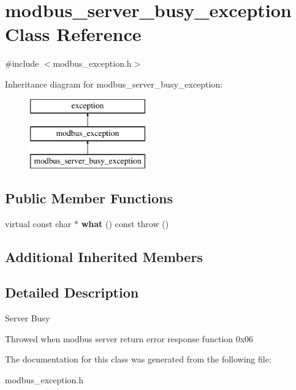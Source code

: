 \hypertarget{classmodbus__server__busy__exception}{}\section{modbus\+\_\+server\+\_\+busy\+\_\+exception Class Reference}
\label{classmodbus__server__busy__exception}


{\ttfamily \#include $<$modbus\+\_\+exception.\+h$>$}

Inheritance diagram for modbus\+\_\+server\+\_\+busy\+\_\+exception\+:\begin{figure}[H]
\begin{center}
\leavevmode
\includegraphics[height=3.000000cm]{classmodbus__server__busy__exception}
\end{center}
\end{figure}
\subsection*{Public Member Functions}
\begin{DoxyCompactItemize}
\item 
\mbox{\label{classmodbus__server__busy__exception_a97bfecb04b195aec8040418e3cb00598}} 
virtual const char $\ast$ {\bfseries what} () const  throw ()
\end{DoxyCompactItemize}
\subsection*{Additional Inherited Members}


\subsection{Detailed Description}
Server Busy

Throwed when modbus server return error response function 0x06 

The documentation for this class was generated from the following file\+:\begin{DoxyCompactItemize}
\item 
modbus\+\_\+exception.\+h\end{DoxyCompactItemize}
